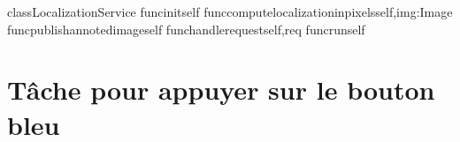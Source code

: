 \documentclass[letterpaper,10pt,english]{sphinxmanual}
\begin{document}
\begin{sphinxVerbatim}[commandchars=\\\{\}]
classLocalizationService
func\PYGZus{}\PYGZus{}init\PYGZus{}\PYGZus{}self
funccompute\PYGZus{}localization\PYGZus{}in\PYGZus{}pixelsself,img:Image
funcpublish\PYGZus{}annoted\PYGZus{}imageself
funchandle\PYGZus{}requestself,req
funcrunself
\end{sphinxVerbatim}





\sphinxstepscope


\chapter{Tâche pour appuyer sur le bouton bleu}
\label{\detokenize{bouton-bleu:tache-pour-appuyer-sur-le-bouton-bleu}}\label{\detokenize{bouton-bleu::doc}}
\end{document}
